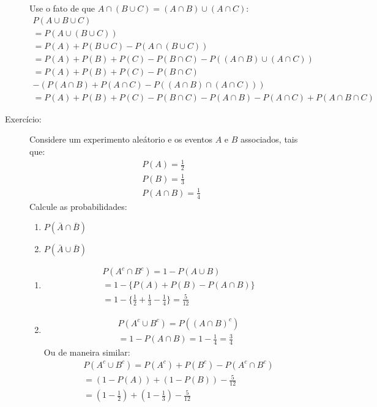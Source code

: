 \begin{description}
    Use o fato de que $A\cap (B \cup C )= (A\cap B )\cup (A \cap C )$:
    \begin{align*}
      P\left(A\cup B\cup C \right)\\
      = P\left(A \cup \left(B \cup C\right) \right)\\
      =P(A)+P(B\cup C)- P\left(A\cap \left(B\cup C \right) \right)\\
      =P(A)+P(B)+P(C)-P(B\cap C)- P\left((A \cap B)\cup (A \cap C)\right)\\
      =P(A)+P(B)+P(C)-P(B\cap C)\\
      - \left( P \left(A \cap B \right)+ P\left(A \cap C \right)-P\left(\left(A \cap B \right) \cap \left(A \cap C \right) \right) \right) \\
      =P(A)+P(B)+P(C)-P(B\cap C)- P(A \cap B)- P(A \cap C)+ P(A \cap B \cap C)
    \end{align*}

  \item [Exercício:]  Considere um experimento aleátorio e os eventos $A$ e $B$ associados, tais que:
    \begin{align*}
      P(A)= \frac{1}{2}\\
      P(B)= \frac{1}{3}\\
      P(A \cap B)= \frac{1}{4}
    \end{align*}
    Calcule as probabilidades:
    \begin{enumerate}[label=(\alph*)]
      \item $ P(\bar{A} \cap \bar{B})$
      \item $P(\bar{A} \cup \bar{B})$
    \end{enumerate}
    \begin{enumerate}[label=(\alph*)]
      \item \begin{align*}
          P(A^c \cap B^c) = 1- P(A \cup B) \\
          = 1- \{ P(A) + P(B) - P(A \cap B) \} \\
          =1 - \{ \frac{1}{2} + \frac{1}{3} -\frac{1}{4}\}= \frac{5}{12}
        \end{align*}
      \item \begin{align*}
          P(A^c \cup B^c) = P\left( \left( A \cap B\right)^c \right)\\
          = 1- P(A \cap B) = 1 - \frac{1}{4}= \frac{3}{4}
        \end{align*}  
        Ou de maneira similar:
        \begin{align*}
          P(A^c \cup B^c) = P(A^c) + P(B^c ) - P(A^c \cap B^c) \\
          = (1- P(A)) + (1- P(B)) - \frac{5}{12} \\
          = (1 - \frac{1}{2})+ (1 - \frac{1}{3})- \frac{5}{12}
        \end{align*}


\end{enumerate}
\end{description}
